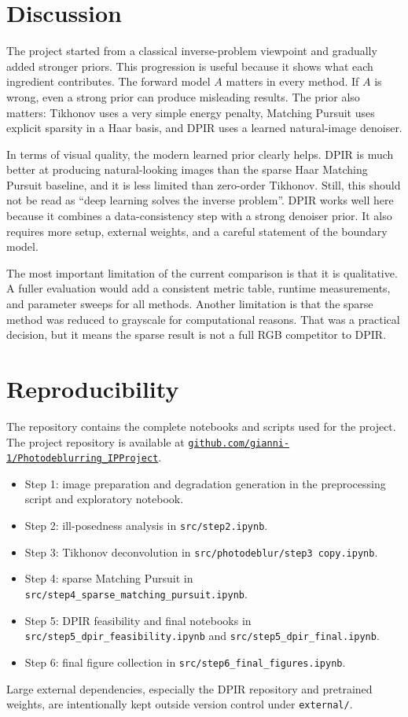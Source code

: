 \documentclass[11pt,a4paper]{article}
\begin{document}
\section{Discussion}

The project started from a classical inverse-problem viewpoint and gradually added stronger priors. This progression is useful because it shows what each ingredient contributes. The forward model $A$ matters in every method. If $A$ is wrong, even a strong prior can produce misleading results. The prior also matters: Tikhonov uses a very simple energy penalty, Matching Pursuit uses explicit sparsity in a Haar basis, and DPIR uses a learned natural-image denoiser.

In terms of visual quality, the modern learned prior clearly helps. DPIR is much better at producing natural-looking images than the sparse Haar Matching Pursuit baseline, and it is less limited than zero-order Tikhonov. Still, this should not be read as ``deep learning solves the inverse problem''. DPIR works well here because it combines a data-consistency step with a strong denoiser prior. It also requires more setup, external weights, and a careful statement of the boundary model.

The most important limitation of the current comparison is that it is qualitative. A fuller evaluation would add a consistent metric table, runtime measurements, and parameter sweeps for all methods. Another limitation is that the sparse method was reduced to grayscale for computational reasons. That was a practical decision, but it means the sparse result is not a full RGB competitor to DPIR.

\section{Reproducibility}

The repository contains the complete notebooks and scripts used for the project. The project repository is available at \href{https://github.com/gianni-1/Photodeblurring_IPProject}{\texttt{github.com/gianni-1/Photodeblurring\_IPProject}}.

\begin{itemize}
  \item Step 1: image preparation and degradation generation in the preprocessing script and exploratory notebook.
  \item Step 2: ill-posedness analysis in \texttt{src/step2.ipynb}.
  \item Step 3: Tikhonov deconvolution in \texttt{src/photodeblur/step3 copy.ipynb}.
  \item Step 4: sparse Matching Pursuit in \texttt{src/step4\_sparse\_matching\_pursuit.ipynb}.
  \item Step 5: DPIR feasibility and final notebooks in \texttt{src/step5\_dpir\_feasibility.ipynb} and \texttt{src/step5\_dpir\_final.ipynb}.
  \item Step 6: final figure collection in \texttt{src/step6\_final\_figures.ipynb}.
\end{itemize}
Large external dependencies, especially the DPIR repository and pretrained weights, are intentionally kept outside version control under \texttt{external/}.

\appendix



\end{document}
